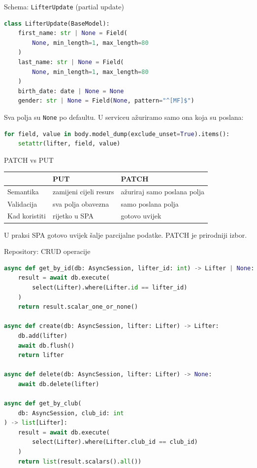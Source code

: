 \begin{frame}[fragile,shrink=5]{Schema: \texttt{LifterUpdate} (partial update)}
\begin{lstlisting}[language=python]
class LifterUpdate(BaseModel):
    first_name: str | None = Field(
        None, min_length=1, max_length=80
    )
    last_name: str | None = Field(
        None, min_length=1, max_length=80
    )
    birth_date: date | None = None
    gender: str | None = Field(None, pattern="^[MF]$")
\end{lstlisting}

\vspace{0.6em}
Sva polja su \texttt{None} po defaultu. U serviceu ažuriramo samo ona koja su poslana:
\begin{lstlisting}[language=python]
for field, value in body.model_dump(exclude_unset=True).items():
    setattr(lifter, field, value)
\end{lstlisting}
\end{frame}

\begin{frame}{PATCH vs PUT}
\begin{tabular}{@{}lp{5cm}p{5cm}@{}}
  \toprule
  & \textbf{PUT} & \textbf{PATCH} \\
  \midrule
  Semantika & zamijeni cijeli resurs & ažuriraj samo poslana polja \\
  Validacija & sva polja obavezna & samo poslana polja \\
  Kad koristiti & rijetko u SPA & gotovo uvijek \\
  \bottomrule
\end{tabular}

\vspace{0.6em}
U praksi SPA gotovo uvijek šalje parcijalne podatke. PATCH je prirodniji izbor.
\end{frame}

\begin{frame}[fragile, shrink=5]{Repository: CRUD operacije}
\begin{lstlisting}[language=python]
async def get_by_id(db: AsyncSession, lifter_id: int) -> Lifter | None:
    result = await db.execute(
        select(Lifter).where(Lifter.id == lifter_id)
    )
    return result.scalar_one_or_none()

async def create(db: AsyncSession, lifter: Lifter) -> Lifter:
    db.add(lifter)
    await db.flush()
    return lifter

async def delete(db: AsyncSession, lifter: Lifter) -> None:
    await db.delete(lifter)

async def get_by_club(
    db: AsyncSession, club_id: int
) -> list[Lifter]:
    result = await db.execute(
        select(Lifter).where(Lifter.club_id == club_id)
    )
    return list(result.scalars().all())
\end{lstlisting}
\end{frame}

